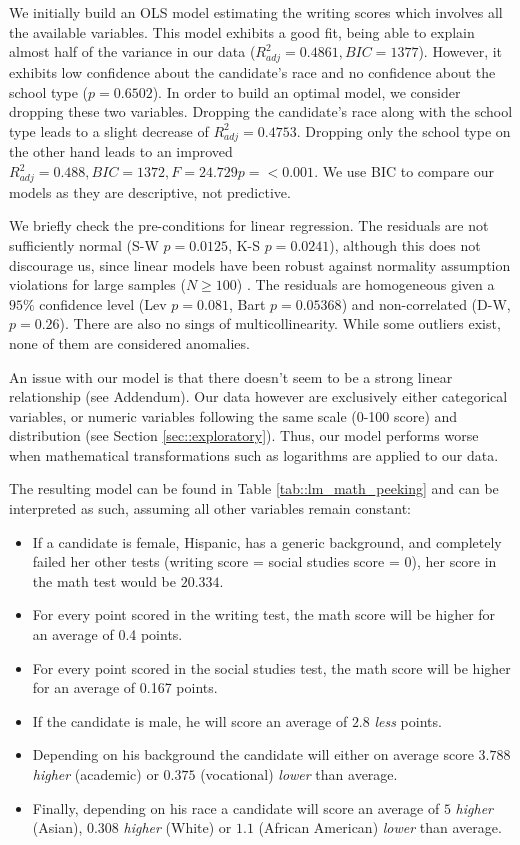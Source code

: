 \documentclass[10pt, a4paper]{article}
\begin{document}
	We initially build an OLS model estimating the writing scores which involves all the available variables. This model exhibits a good fit, being able to explain almost half of the variance in our data ($R^2_{adj} = 0.4861, BIC=1377$). However, it exhibits low confidence about the candidate's race and no confidence about the school type ($p=0.6502$). In order to build an optimal model, we consider dropping these two variables. Dropping the candidate's race along with the school type leads to a slight decrease of $R^2_{adj} = 0.4753$. Dropping only the school type on the other hand leads to an improved $R^2_{adj} = 0.488, BIC=1372, F= 24.729 p=<0.001$. We use BIC to compare our models as they are descriptive, not predictive.
	
	We briefly check the pre-conditions for linear regression. The residuals are not sufficiently normal (S-W $p = 0.0125$, K-S $p=0.0241$), although this does not discourage us, since linear models have been robust against normality assumption violations for large samples ($N\geq 100$) \cite{ols_linear}. The residuals are homogeneous given a $95\%$ confidence level (Lev $p = 0.081$, Bart $p = 0.05368$) and non-correlated (D-W, $p=0.26$). There are also no sings of multicollinearity. While some outliers exist, none of them are considered anomalies.
	
	An issue with our model is that there doesn't seem to be a strong linear relationship (see Addendum). Our data however are exclusively either categorical variables, or numeric variables following the same scale (0-100 score) and distribution (see Section \ref{sec::exploratory}). Thus, our model performs worse when mathematical transformations such as logarithms are applied to our data.
	
	The resulting model can be found in Table \ref{tab::lm_math_peeking} and can be interpreted as such, assuming all other variables remain constant: 
	\begin{itemize}
		\item If a candidate is female, Hispanic, has a generic background, and completely failed her other tests (writing score = social studies score = 0), her score in the math test would be $20.334$. 
		\item For every point scored in the writing test, the math score will be higher for an average of 0.4 points.
		\item For every point scored in the social studies test, the math score will be higher for an average of 0.167 points.
		\item If the candidate is male, he will score an average of $2.8$ \textit{less} points.
		\item Depending on his background the candidate will either on average score $3.788$ \textit{higher} (academic) or $0.375$ (vocational)  \textit{lower} than average.
		\item Finally, depending on his race a candidate will score an average of $5$ \textit{higher} (Asian), $0.308$ \textit{higher} (White) or $1.1$ (African American) \textit{lower} than average.
	\end{itemize}
\end{document}
